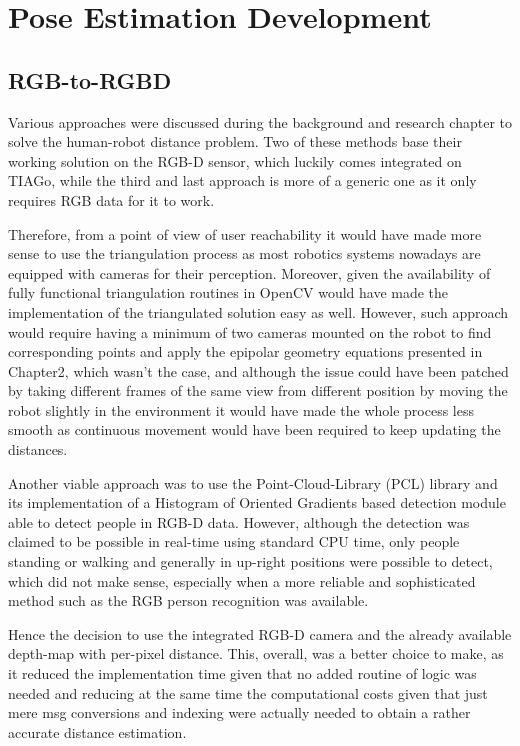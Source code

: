 \chapter{Pose Estimation Development}
\label{chapter4}

\section{RGB-to-RGBD}

Various approaches were discussed during the background and research chapter to solve the human-robot distance problem. Two of these methods base their working solution on the RGB-D sensor, which luckily comes integrated on TIAGo, while the third and last approach is more of a generic one as it only requires RGB data for it to work.

Therefore, from a point of view of user reachability it would have made more sense to use the triangulation process as most robotics systems nowadays are equipped with cameras for their perception. Moreover, given the availability of fully functional triangulation routines in OpenCV would have made the implementation of the triangulated solution easy as well. However, such approach would require having a minimum of two cameras mounted on the robot to find corresponding points and apply the epipolar geometry equations presented in Chapter2, which wasn't the case, and although the issue could have been patched by taking different frames of the same view from different position by moving the robot slightly in the environment it would have made the whole process less smooth as continuous movement would have been required to keep updating the distances.

Another viable approach was to use the Point-Cloud-Library (PCL) library and its implementation of a Histogram of Oriented Gradients based detection module able to detect people in RGB-D data. However, although the detection was claimed to be possible in real-time using standard CPU time, only people standing or walking and generally in up-right positions were possible to detect, which did not make sense, especially when a more reliable and sophisticated method such as the RGB person recognition was available.

Hence the decision to use the integrated RGB-D camera and the already available depth-map with per-pixel distance. This, overall, was a better choice to make, as it reduced the implementation time given that no added routine of logic was needed and reducing at the same time the computational costs given that just mere msg conversions and indexing were actually needed to obtain a rather accurate distance estimation.
\clearpage

